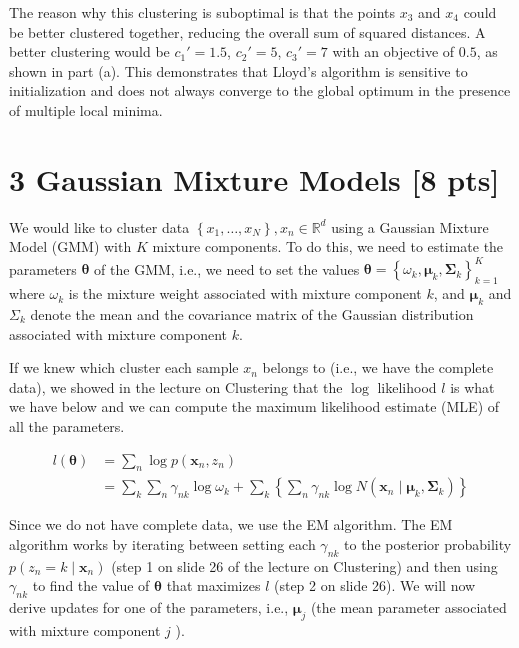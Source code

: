 \documentclass[10pt]{article}
\begin{document}
The reason why this clustering is suboptimal is that the points \( x_3 \) and \( x_4 \) could be better clustered together, reducing the overall sum of squared distances. A better clustering would be \( c_1' = 1.5 \), \( c_2' = 5 \), \( c_3' = 7 \) with an objective of \( 0.5 \), as shown in part (a). This demonstrates that Lloyd's algorithm is sensitive to initialization and does not always converge to the global optimum in the presence of multiple local minima. \\

\section*{3 Gaussian Mixture Models [8 pts]}
We would like to cluster data $\left\{x_{1}, \ldots, x_{N}\right\}, x_{n} \in \mathbb{R}^{d}$ using a Gaussian Mixture Model (GMM) with $K$ mixture components. To do this, we need to estimate the parameters $\boldsymbol{\theta}$ of the GMM, i.e., we need to set the values $\boldsymbol{\theta}=\left\{\omega_{k}, \boldsymbol{\mu}_{k}, \boldsymbol{\Sigma}_{k}\right\}_{k=1}^{K}$ where $\omega_{k}$ is the mixture weight associated with mixture component $k$, and $\boldsymbol{\mu}_{k}$ and $\Sigma_{k}$ denote the mean and the covariance matrix of the Gaussian distribution associated with mixture component $k$.

If we knew which cluster each sample $x_{n}$ belongs to (i.e., we have the complete data), we showed in the lecture on Clustering that the $\log$ likelihood $l$ is what we have below and we can compute the maximum likelihood estimate (MLE) of all the parameters.


\begin{align*}
l(\boldsymbol{\theta}) & =\sum_{n} \log p\left(\boldsymbol{x}_{n}, z_{n}\right) \\
& =\sum_{k} \sum_{n} \gamma_{n k} \log \omega_{k}+\sum_{k}\left\{\sum_{n} \gamma_{n k} \log N\left(\boldsymbol{x}_{n} \mid \boldsymbol{\mu}_{k}, \boldsymbol{\Sigma}_{k}\right)\right\} \tag{1}
\end{align*}


Since we do not have complete data, we use the EM algorithm. The EM algorithm works by iterating between setting each $\gamma_{n k}$ to the posterior probability $p\left(z_{n}=k \mid \boldsymbol{x}_{n}\right)$ (step 1 on slide 26 of the lecture on Clustering) and then using $\gamma_{n k}$ to find the value of $\boldsymbol{\theta}$ that maximizes $l$ (step 2 on slide 26). We will now derive updates for one of the parameters, i.e., $\boldsymbol{\mu}_{j}$ (the mean parameter associated with mixture component $j$ ).
\end{document}
